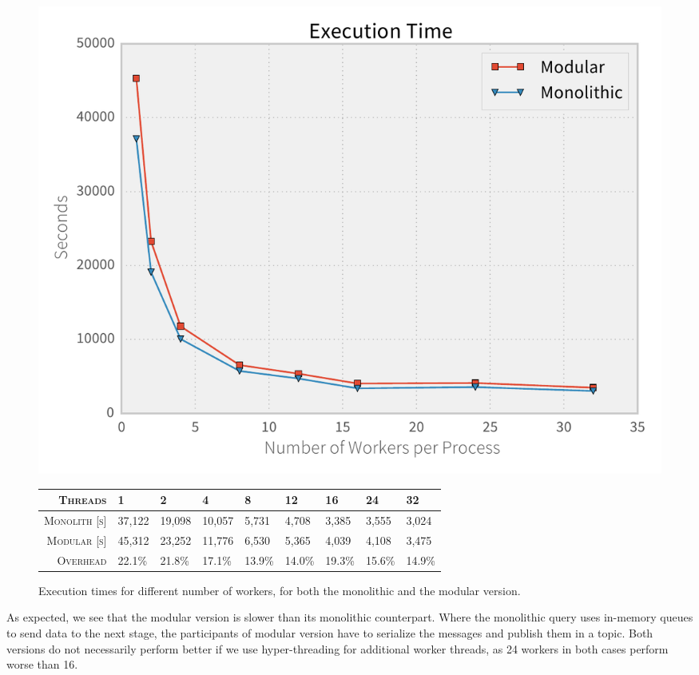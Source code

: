 \begin{figure}[htb]
  \centering
    \includegraphics[width=1\textwidth]{figures/evaluation/times}

    {\footnotesize
    \vspace{1em}
    \begin{tabularx}{\textwidth}{ rXXXXXXXX }
      \hline 
      \textsc{Threads} & 1 & 2 & 4 & 8 & 12 & 16 & 24 & 32 \\
      \hline 
      \textsc{Monolith [s]} & 37,122 & 19,098 & 10,057 & 5,731 & 4,708 & 3,385 & 3,555 & 3,024 \\
      \textsc{Modular [s]}  & 45,312 & 23,252 & 11,776 & 6,530 & 5,365 & 4,039 & 4,108 & 3,475 \\
      \hline
      \textsc{Overhead} & 22.1\%&21.8\%&17.1\%&13.9\%&14.0\%&19.3\%&15.6\%&14.9\% \\ %
      \hline
    \end{tabularx}
    }
    \caption[Execution times for different number of workers]{
    Execution times for different number of workers, for both the monolithic
    and the modular version.}
    \label{fig:times}
\end{figure}

As expected, we see that the modular version is slower than its monolithic
counterpart. Where the monolithic query uses in-memory queues to send data
to the next stage, the participants of modular version have to serialize
the messages and publish them in a topic. Both versions do not necessarily
perform better if we use hyper-threading for additional worker threads,
as 24 workers in both cases perform worse than 16.

